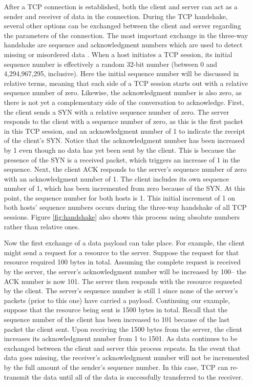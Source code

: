 \documentclass[sigplan,screen,nonacm]{acmart}
\begin{document}
After a TCP connection is established, both the client and server can act as a sender and receiver of data in the connection. During the TCP handshake, several other options can be exchanged between the client and server regarding the parameters of the connection. The most important exchange in the three-way handshake are sequence and acknowledgment numbers which are used to detect missing or misordered data \cite{Stevens:2011}. When a host initiates a TCP session, its initial sequence number is effectively a random 32-bit number (between 0 and 4,294,967,295, inclusive). Here the initial sequence number will be discussed in relative terms, meaning that each side of a TCP session starts out with a relative sequence number of zero. Likewise, the acknowledgment number is also zero, as there is not yet a complementary side of the conversation to acknowledge. First, the client sends a SYN with a relative sequence number of zero. The server responds to the client with a sequence number of zero, as this is the first packet in this TCP session, and an acknowledgment number of 1 to indicate the receipt of the client's SYN. Notice that the acknowledgment number has been increased by 1 even though no data has yet been sent by the client. This is because the presence of the SYN is a received packet, which triggers an increase of 1 in the sequence. Next, the client ACK responds to the server's sequence number of zero with an acknowledgment number of 1. The client includes its own sequence number of 1, which has been incremented from zero because of the SYN. At this point, the sequence number for both hosts is 1. This initial increment of 1 on both hosts' sequence numbers occurs during the three-way handshake of all TCP sessions. Figure \ref{fig:handshake} also shows this process using absolute numbers rather than relative ones.

Now the first exchange of a data payload can take place. For example, the client might send a request for a resource to the server. Suppose the request for that resource required 100 bytes in total. Assuming the complete request is received by the server, the server's acknowledgment number will be increased by 100-- the ACK number is now 101. The server then responds with the resource requested by the client. The server's sequence number is still 1 since none of the server's packets (prior to this one) have carried a payload. Continuing our example, suppose that the resource being sent is 1500 bytes in total. Recall that the sequence number of the client has been increased to 101 because of the last packet the client sent. Upon receiving the 1500 bytes from the server, the client increases its acknowledgment number from 1 to 1501. As data continues to be exchanged between the client and server this process repeats. In the event that data goes missing, the receiver’s acknowledgment number will not be incremented by the full amount of the sender's sequence number. In this case, TCP can re-transmit the data until all of the data is successfully transferred to the receiver. 
\end{document}
